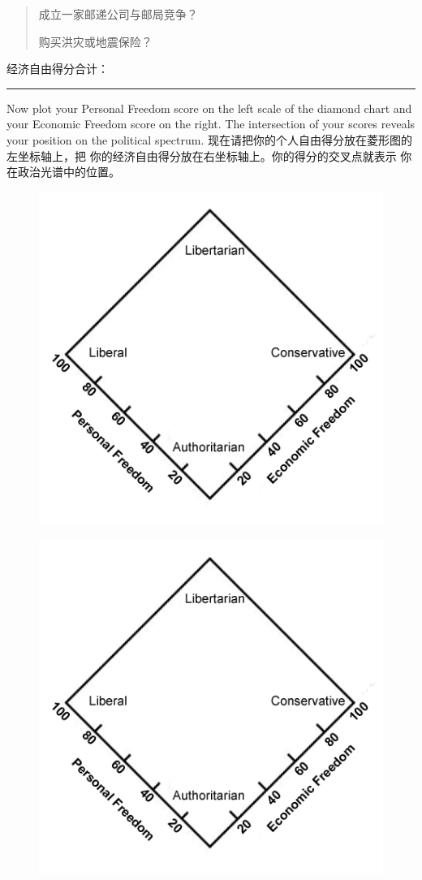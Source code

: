 \begin{paracol}{2}
\begin{quotation}
成立一家邮递公司与邮局竞争？

购买洪灾或地震保险？
\end{quotation}
\noindent 经济自由得分合计：\rule[0pt]{2cm}{0.5pt}
\switchcolumn*
Now plot your Personal Freedom score on the left scale of the
diamond chart and your Economic Freedom score on the right.
The intersection of your scores reveals your position on the political spectrum.
\switchcolumn
现在请把你的个人自由得分放在菱形图的左坐标轴上，把
你的经济自由得分放在右坐标轴上。你的得分的交叉点就表示
你在政治光谱中的位置。
\switchcolumn*
\begin{figure}[!htb]
	\centering
	\includegraphics[width=0.7\linewidth]{1}
\end{figure}
\switchcolumn
\begin{figure}[!htb]
	\centering
	\includegraphics[width=0.7\linewidth]{1}
\end{figure}

\end{paracol}
